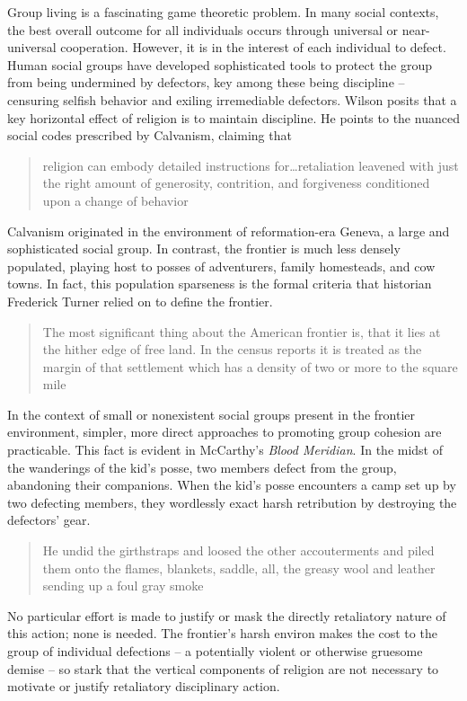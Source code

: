 Group living is a fascinating game theoretic problem.
In many social contexts, the best overall outcome for all individuals occurs through universal or near-universal cooperation.
However, it is in the interest of each individual to defect.
Human social groups have developed sophisticated tools to protect the group from being undermined by defectors, key among these being discipline -- censuring selfish behavior and exiling irremediable defectors.
Wilson posits that a key horizontal effect of religion is to maintain discipline.
He points to the nuanced social codes prescribed by Calvanism, claiming that \blockcquote[p 250]{Wilson2007EvolutionLives}{religion can embody detailed instructions for\ldots retaliation leavened with just the right amount of generosity, contrition, and forgiveness conditioned upon a change of behavior}.
Calvanism originated in the environment of reformation-era Geneva, a large and sophisticated social group.
In contrast, the frontier is much less densely populated, playing host to posses of adventurers, family homesteads, and cow towns.
In fact, this population sparseness is the formal criteria that historian Frederick Turner relied on to define the frontier.
\blockcquote{Turner1894TheHistory}{The most significant thing about the American frontier is, that it lies at the hither edge of free land.
In the census reports it is treated as the margin of that settlement which has a density of two or more to the square mile}.
In the context of small or nonexistent social groups present in the frontier environment, simpler, more direct approaches to promoting group cohesion are practicable.
This fact is evident in McCarthy's \textit{Blood Meridian}.
In the midst of the wanderings of the kid's posse, two members defect from the group, abandoning their companions.
When the kid's posse encounters a camp set up by two defecting members, they wordlessly exact harsh retribution by destroying the defectors' gear.
\blockcquote[p 112]{McCarthy1992BloodWest}{He undid the girthstraps and loosed the other accouterments and piled them onto the flames, blankets, saddle, all, the greasy wool and leather sending up a foul gray smoke}.
No particular effort is made to justify or mask the directly retaliatory nature of this action; none is needed.
The frontier's harsh environ makes the cost to the group of individual defections -- a potentially violent or otherwise gruesome demise -- so stark that the vertical components of religion are not necessary to motivate or justify retaliatory disciplinary action.
